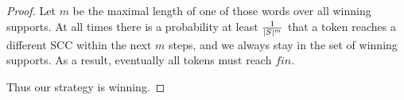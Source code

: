 \documentclass{article}
\begin{document}
\begin{proof}
	Let $m$ be the maximal length of one of those words over all winning supports.
	At all times there is a probability at least $\frac{1}{|S|^m}$ that a token reaches a different SCC within the next $m$ steps, and we always stay in the set of winning supports. As a result, eventually all tokens must reach $fin$.
	
	Thus our strategy is winning. 
	
%	
%	
%	
%	
%	
%	
%	
%	
%	
% 	 
%	
%	

\end{proof}
\end{document}
